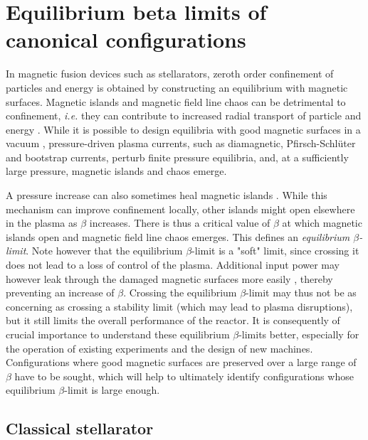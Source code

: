 \documentclass[my_thesis.tex]{subfiles}
\begin{document}
\chapter{Equilibrium beta limits of canonical configurations} \label{ch5.equilibrium_beta_limit}

In magnetic fusion devices such as stellarators, zeroth order confinement of particles and energy is obtained by constructing an equilibrium with magnetic surfaces.
Magnetic islands and magnetic field line chaos can be detrimental to confinement, \textit{i.e.} they can contribute to increased radial transport of particle and energy \citep{Hudson2010}.
While it is possible to design equilibria with good magnetic surfaces in a vacuum \citep{Cary1985,Cary1986,pedersenConfirmationTopologyWendelstein2016}, pressure-driven plasma currents, such as diamagnetic, Pfirsch-Schl\"uter and bootstrap currents, perturb finite pressure equilibria, and, at a sufficiently large pressure, magnetic islands and chaos emerge. 


A pressure increase can also sometimes heal magnetic islands \citep{Bhattacharjee1995}. While this mechanism can improve confinement locally, other islands might open elsewhere in the plasma as $\beta$ increases.
There is thus a critical value of $\beta$ at which magnetic islands open and magnetic field line chaos emerges. This defines an \emph{equilibrium $\beta$-limit}.
Note however that the equilibrium $\beta$-limit is a "soft" limit, since crossing it does not lead to a loss of control of the plasma. Additional input power may however leak through the damaged magnetic surfaces more easily \citep{rechesterElectronHeatTransport1978}, thereby preventing an increase of $\beta$. Crossing the equilibrium $\beta$-limit may thus not be as concerning as crossing a stability limit (which may lead to plasma disruptions), but it still limits the overall performance of the reactor. It is consequently of crucial importance to understand these equilibrium $\beta$-limits better, especially for the operation of existing experiments and the design of new machines. Configurations where good magnetic surfaces are preserved over a large range of $\beta$ have to be sought, which will help to ultimately identify configurations whose equilibrium $\beta$-limit is large enough.


\section{Classical stellarator}
\end{document}
